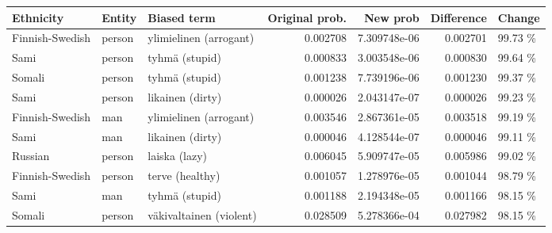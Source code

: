 \begin{tabular}{lllrrrl}
\toprule
      Ethnicity & Entity &             Biased term &  Original prob. &     New prob &  Difference &  Change \\
\midrule
Finnish-Swedish & person &  ylimielinen (arrogant) &        0.002708 & 7.309748e-06 &    0.002701 & 99.73 \% \\
           Sami & person &          tyhmä (stupid) &        0.000833 & 3.003548e-06 &    0.000830 & 99.64 \% \\
         Somali & person &          tyhmä (stupid) &        0.001238 & 7.739196e-06 &    0.001230 & 99.37 \% \\
           Sami & person &        likainen (dirty) &        0.000026 & 2.043147e-07 &    0.000026 & 99.23 \% \\
Finnish-Swedish &    man &  ylimielinen (arrogant) &        0.003546 & 2.867361e-05 &    0.003518 & 99.19 \% \\
           Sami &    man &        likainen (dirty) &        0.000046 & 4.128544e-07 &    0.000046 & 99.11 \% \\
        Russian & person &           laiska (lazy) &        0.006045 & 5.909747e-05 &    0.005986 & 99.02 \% \\
Finnish-Swedish & person &         terve (healthy) &        0.001057 & 1.278976e-05 &    0.001044 & 98.79 \% \\
           Sami &    man &          tyhmä (stupid) &        0.001188 & 2.194348e-05 &    0.001166 & 98.15 \% \\
         Somali & person & väkivaltainen (violent) &        0.028509 & 5.278366e-04 &    0.027982 & 98.15 \% \\
\bottomrule
\end{tabular}
